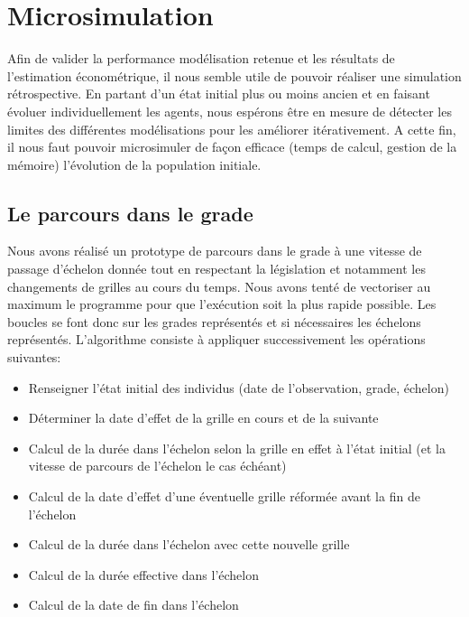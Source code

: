 \documentclass[11pt,a4paper]{article}
\begin{document}
\else \fi



\section{Microsimulation}


Afin de valider la performance modélisation retenue et les résultats de l'estimation économétrique, il nous semble utile de pouvoir réaliser une simulation rétrospective. En partant d'un état initial plus ou moins ancien et en faisant évoluer individuellement les agents, nous espérons être en mesure de détecter les limites des différentes modélisations pour les améliorer itérativement. A cette fin, il nous faut pouvoir microsimuler de façon efficace (temps de calcul, gestion de la mémoire) l'évolution de la population initiale.  


\subsection{Le parcours dans le grade}

Nous avons réalisé un prototype de parcours dans le grade à une vitesse de passage d'échelon donnée tout en respectant la législation et notamment les changements de grilles au cours du temps. Nous avons tenté de vectoriser au maximum le programme pour que l'exécution soit la plus rapide possible.
Les boucles se font donc sur les grades représentés et si nécessaires les échelons représentés. L'algorithme consiste à appliquer successivement les opérations suivantes:
\begin{itemize}
	\item Renseigner l'état initial des individus (date de l'observation, grade, échelon)
	\item Déterminer la date d'effet de la grille en cours et de la suivante
	\item Calcul de la durée dans l'échelon selon la grille en effet à l'état initial (et la vitesse de parcours de l'échelon le cas échéant)
	\item Calcul de la date d'effet d'une éventuelle grille réformée avant la fin de l'échelon
	\item Calcul de la durée dans l'échelon avec cette nouvelle grille
	\item Calcul de la durée effective dans l'échelon
	\item Calcul de la date de fin dans l'échelon
\end{itemize}
 
\end{document}
